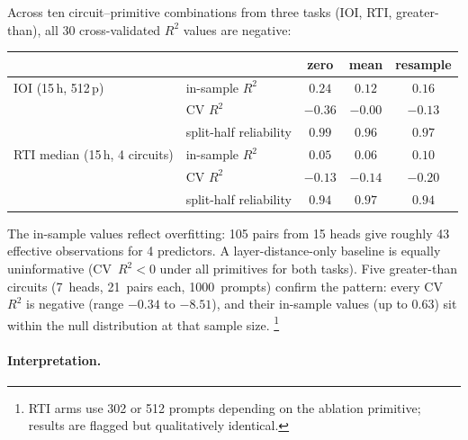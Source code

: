 Across ten circuit--primitive combinations from three tasks (IOI, RTI,
greater-than), all 30 cross-validated $R^2$ values are negative:

\medskip

\begin{tabular}{llccc}
\toprule
 & & zero & mean & resample \\
\midrule
IOI (15\,h, 512\,p)
 & in-sample $R^2$ & $0.24$ & $0.12$ & $0.16$ \\
 & CV $R^2$ & $-0.36$ & $-0.00$ & $-0.13$ \\
 & split-half reliability & $0.99$ & $0.96$ & $0.97$ \\
\midrule
RTI median (15\,h, 4 circuits)
 & in-sample $R^2$ & $0.05$ & $0.06$ & $0.10$ \\
 & CV $R^2$ & $-0.13$ & $-0.14$ & $-0.20$ \\
 & split-half reliability & $0.94$ & $0.97$ & $0.94$ \\
\bottomrule
\end{tabular}

\medskip

\noindent The in-sample values reflect overfitting: 105 pairs from 15 heads
give roughly 43 effective observations for 4 predictors. A
layer-distance-only baseline is equally uninformative (CV~$R^2 < 0$ under
all primitives for both tasks). Five greater-than circuits (7~heads,
21~pairs each, 1000~prompts) confirm the pattern: every CV~$R^2$ is
negative (range $-0.34$ to $-8.51$), and their in-sample values (up to
$0.63$) sit within the null distribution at that sample size.%
\footnote{RTI arms use 302 or 512 prompts depending on the ablation
primitive; results are flagged but qualitatively identical.}

\paragraph{Interpretation.}


